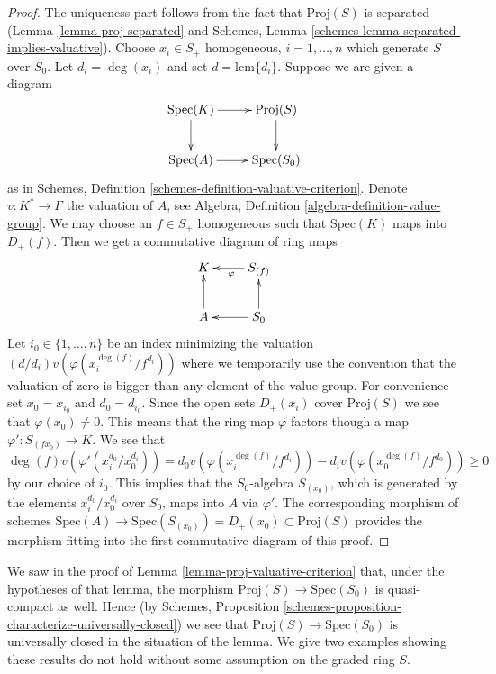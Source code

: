 \begin{proof}
The uniqueness part follows from the fact that $\text{Proj}(S)$ is
separated (Lemma \ref{lemma-proj-separated} and
Schemes, Lemma \ref{schemes-lemma-separated-implies-valuative}).
Choose $x_i \in S_{+}$ homogeneous, $i = 1, \ldots, n$
which generate $S$ over $S_0$. Let $d_i = \deg(x_i)$ and
set $d = \text{lcm}\{d_i\}$. Suppose we are given a diagram
$$
\xymatrix{
\text{Spec}(K) \ar[r] \ar[d] & \text{Proj}(S) \ar[d] \\
\text{Spec}(A) \ar[r] & \text{Spec}(S_0)
}
$$
as in Schemes, Definition \ref{schemes-definition-valuative-criterion}.
Denote $v : K^* \to \Gamma$ the valuation of $A$, see
Algebra, Definition \ref{algebra-definition-value-group}.
We may choose an $f \in S_{+}$ homogeneous such that
$\text{Spec}(K)$ maps into $D_{+}(f)$. Then we get a commutative
diagram of ring maps
$$
\xymatrix{
K & S_{(f)} \ar[l]^{\varphi} \\
A \ar[u] & S_0 \ar[l] \ar[u]
}
$$
Let $i_0 \in \{1, \ldots, n\}$ be an index minimizing the
valuation $(d/d_i)v(\varphi(x_i^{\deg(f)}/f^{d_i}))$ where we
temporarily use the convention that the valuation of zero
is bigger than any element of the value group.
For convenience set $x_0 = x_{i_0}$ and $d_0 = d_{i_0}$.
Since the open sets $D_{+}(x_i)$ cover $\text{Proj}(S)$
we see that $\varphi(x_0) \not = 0$. This means that
the ring map $\varphi$ factors though a map
$\varphi' : S_{(fx_0)} \to K$.
We see that
$$
\deg(f) v(\varphi'(x_i^{d_0}/x_0^{d_i})) =
d_0 v(\varphi(x_i^{\deg(f)}/f^{d_i})) -
d_i v(\varphi(x_0^{\deg(f)}/f^{d_0})) \geq 0
$$
by our choice of $i_0$. This implies that the $S_0$-algebra
$S_{(x_0)}$, which is generated by the elements
$x_i^{d_0}/x_0^{d_i}$ over $S_0$, maps into $A$ via $\varphi'$.
The corresponding morphism of schemes
$\text{Spec}(A) \to \text{Spec}(S_{(x_0)}) = D_{+}(x_0)
\subset \text{Proj}(S)$ provides the morphism fitting into
the first commutative diagram of this proof.
\end{proof}

\noindent
We saw in the proof of Lemma \ref{lemma-proj-valuative-criterion}
that, under the hypotheses of that lemma, the morphism
$\text{Proj}(S) \to \text{Spec}(S_0)$ is quasi-compact as well. Hence (by
Schemes, Proposition \ref{schemes-proposition-characterize-universally-closed})
we see that $\text{Proj}(S) \to \text{Spec}(S_0)$ is universally closed in
the situation of the lemma. We give two examples showing these results
do not hold without some assumption on the graded ring $S$.

